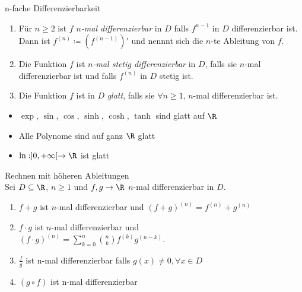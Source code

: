 
\begin{definition}{n-fache Differenzierbarkeit}
	\begin{enumerate}
		\item Für $n \geq 2$ ist $f$ \emph{$n$-mal differenzierbar} in $D$ falls $f^{n-1}$ in $D$ differenzierbar ist. Dann ist $f^{(n)} \coloneqq \left(f^{(n-1)}\right)'$ und nennnt sich die $n$-te Ableitung von $f$.
		\item Die Funktion $f$ ist \emph{$n$-mal stetig differenzierbar} in $D$, falls sie $n$-mal differenzierbar ist und falls $f^{(n)}$ in $D$ stetig ist.
		\item Die Funktion $f$ ist in $D$ \emph{glatt}, falls sie $\forall n \geq 1$, $n$-mal differenzierbar ist. 
	\end{enumerate}
\end{definition}


\begin{itemize}
	\item $\exp$, $\sin$, $\cos$, $\sinh$, $\cosh$, $\tanh$ sind glatt auf $\R$
	\item Alle Polynome sind auf ganz $\R$ glatt
	\item $\ln : ]0, + \infty[ \to \R$ ist glatt
\end{itemize}

\begin{theorem}{Rechnen mit höheren Ableitungen}\\
	Sei $D \subseteq \R$, $n \geq 1$ und $f,g \to \R$ $n$-mal differenzierbar in $D$.
	\begin{enumerate}
		\item $f+g$ ist $n$-mal differenzierbar und $(f + g)^{(n)} = f^{(n)} + g^{(n)}$
		\item $f \cdot g$ ist $n$-mal differenzierbar und\\ $(f \cdot g)^{(n)} = \sum_{k=0}^n \binom{n}{k} f^{(k)} g^{(n-k)}$.
        \item $\frac{f}{g}$ ist n-mal differenzierbar falls $g(x) \neq 0, \forall x \in D$
        \item $(g \circ f)$ ist n-mal differenzierbar
	\end{enumerate}
\end{theorem}



